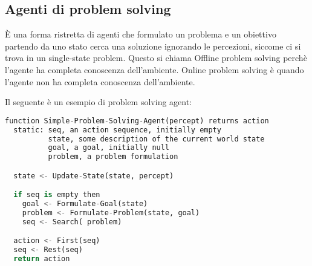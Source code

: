 \documentclass[a4paper]{article}
\begin{document}
\subsection{Agenti di problem solving}
È una forma ristretta di agenti che formulato un problema e un obiettivo partendo da uno stato
cerca una soluzione ignorando le percezioni, siccome ci si trova in un single-state problem.
Questo si chiama Offline problem solving perchè l'agente ha completa conoscenza dell'ambiente.
Online problem solving è quando l'agente non ha completa conoscenza dell'ambiente.
\begin{example}
  Il seguente è un esempio di problem solving agent:
  \begin{lstlisting}[language=Python]
function Simple-Problem-Solving-Agent(percept) returns action
  static: seq, an action sequence, initially empty
          state, some description of the current world state
          goal, a goal, initially null
          problem, a problem formulation

  state <- Update-State(state, percept)

  if seq is empty then
    goal <- Formulate-Goal(state)
    problem <- Formulate-Problem(state, goal)
    seq <- Search( problem)

  action <- First(seq)
  seq <- Rest(seq)
  return action
  \end{lstlisting}
\end{example}
\end{document}

